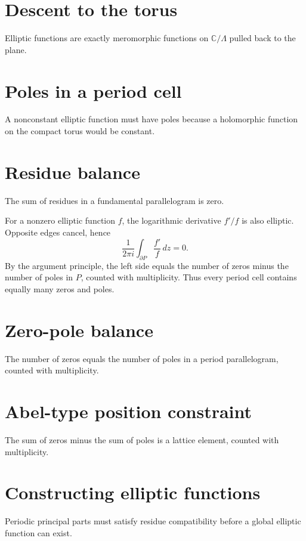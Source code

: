 \section{Descent to the torus}
Elliptic functions are exactly meromorphic functions on $\mathbb C/\Lambda$ pulled back to the plane.

\section{Poles in a period cell}
A nonconstant elliptic function must have poles because a holomorphic function on the compact torus would be constant.

\section{Residue balance}
The sum of residues in a fundamental parallelogram is zero.

\begin{example}\label{ex:iv28-expand-02}
For a nonzero elliptic function \(f\), the logarithmic derivative \(f'/f\) is also elliptic. Opposite edges cancel, hence
\[
\frac1{2\pi i}\int_{\partial P}\frac{f'}{f}\,dz=0.
\]
By the argument principle, the left side equals the number of zeros minus the number of poles in \(P\), counted with multiplicity. Thus every period cell contains equally many zeros and poles.
\end{example}
\section{Zero-pole balance}
The number of zeros equals the number of poles in a period parallelogram, counted with multiplicity.

\section{Abel-type position constraint}
The sum of zeros minus the sum of poles is a lattice element, counted with multiplicity.

\section{Constructing elliptic functions}
Periodic principal parts must satisfy residue compatibility before a global elliptic function can exist.


